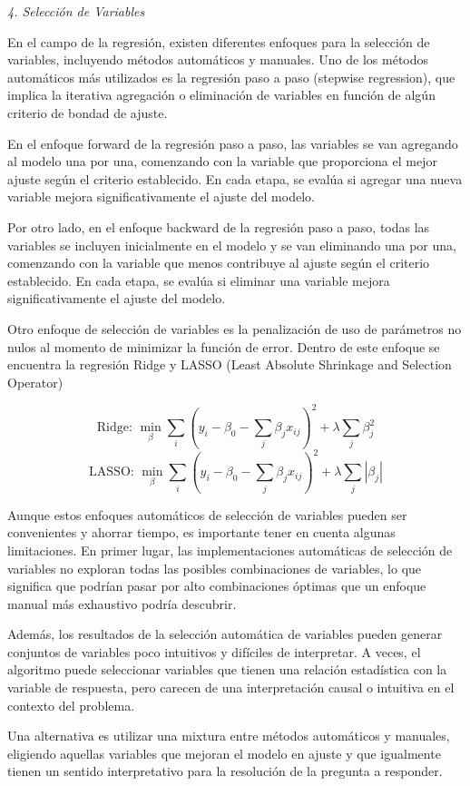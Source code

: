 \documentclass[
]{book}
\begin{document}
\emph{4. Selección de Variables}

En el campo de la regresión, existen diferentes enfoques para la
selección de variables, incluyendo métodos automáticos y manuales. Uno
de los métodos automáticos más utilizados es la regresión paso a paso
(stepwise regression), que implica la iterativa agregación o eliminación
de variables en función de algún criterio de bondad de ajuste.

En el enfoque forward de la regresión paso a paso, las variables se van
agregando al modelo una por una, comenzando con la variable que
proporciona el mejor ajuste según el criterio establecido. En cada
etapa, se evalúa si agregar una nueva variable mejora significativamente
el ajuste del modelo.

Por otro lado, en el enfoque backward de la regresión paso a paso, todas
las variables se incluyen inicialmente en el modelo y se van eliminando
una por una, comenzando con la variable que menos contribuye al ajuste
según el criterio establecido. En cada etapa, se evalúa si eliminar una
variable mejora significativamente el ajuste del modelo.

Otro enfoque de selección de variables es la penalización de uso de
parámetros no nulos al momento de minimizar la función de error. Dentro
de este enfoque se encuentra la regresión Ridge y LASSO (Least Absolute
Shrinkage and Selection Operator)

\[\text{Ridge: }\min_{β} \sum_{i}(y_i - \beta_0 - \sum_{j}\beta_{j}x_{ij})^2 + λ\sum_{j}\beta_{j}^2\]
\[\text{LASSO: }\min_{β}\sum_{i}(y_i - \beta_0 - \sum_{j}\beta_{j}x_{ij})^2 + λ\sum_{j}|\beta_{j}|\]

Aunque estos enfoques automáticos de selección de variables pueden ser
convenientes y ahorrar tiempo, es importante tener en cuenta algunas
limitaciones. En primer lugar, las implementaciones automáticas de
selección de variables no exploran todas las posibles combinaciones de
variables, lo que significa que podrían pasar por alto combinaciones
óptimas que un enfoque manual más exhaustivo podría descubrir.

Además, los resultados de la selección automática de variables pueden
generar conjuntos de variables poco intuitivos y difíciles de
interpretar. A veces, el algoritmo puede seleccionar variables que
tienen una relación estadística con la variable de respuesta, pero
carecen de una interpretación causal o intuitiva en el contexto del
problema.

Una alternativa es utilizar una mixtura entre métodos automáticos y
manuales, eligiendo aquellas variables que mejoran el modelo en ajuste y
que igualmente tienen un sentido interpretativo para la resolución de la
pregunta a responder.
\end{document}

